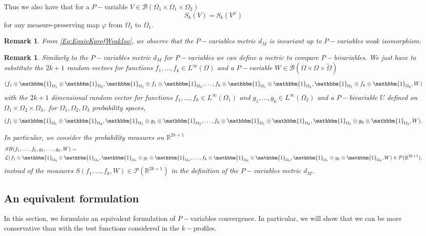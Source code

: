 \documentclass[11pt]{article}
\newtheorem{remark}[theorem]{Remark}
\def\R{\mathbb{R}}
\newcommand{\cB}{{\mathcal B}}  %
\newcommand{\cP}{{\mathcal P}}  %
\begin{document}
Thus we also have that for a $P-$variable  $V \in \cB(\Omega_1\times \Omega_1\times \Omega_2)$
$$
S_k(V)=S_k(V^{\varphi})
$$
for any measure-preserving map $\varphi$ from $\Omega_1$ to $\Omega_1.$

\begin{remark}\label{RMK:InvarianceKProfiles}
From \eqref{Eq:EquivKprofWeakIso}, we observe that the $P-$variables metric $d_M$ is invariant up to $P-$variables weak isomorphism. 
\end{remark}


\begin{remark}\label{RmkDistanseBBBisets}
Similarly to the $P-$variables metric $d_M$ for $P-$variables we can define a metric to compare $P-$bivariables. We just have to substitute the $2k+1$ random vectors for functions $f_1,\ldots, f_{k}\in L^{\infty}(\Omega)$ and a $P-$variable $W\in \cB(\Omega\times\Omega\times \widetilde\Omega)$ 
$$
(f_1 \otimes\mathbbm{1}_{\Omega_1} \otimes \mathbbm{1}_{\Omega_2},\mathbbm{1}_{\Omega_1}\otimes f_1 \otimes\mathbbm{1}_{\Omega_2},\ldots, f_k \otimes\mathbbm{1}_{\Omega_1} \otimes \mathbbm{1}_{\Omega_2},\mathbbm{1}_{\Omega_1}\otimes f_k \otimes\mathbbm{1}_{\Omega_2},W)
$$
with the $2k+1$ dimensional random vector for functions $f_1,\ldots, f_{k}\in L^{\infty}(\Omega_1)$ and $g_1,\ldots,g_k\in L^{\infty}(\Omega_2)$ and a $P-$bivariable $U$ defined on $\Omega_1\times \Omega_2 \times \Omega_3,$ for $\Omega_1,\Omega_2, \Omega_3$ probability spaces,
$$
(f_1 \otimes\mathbbm{1}_{\Omega_1} \otimes \mathbbm{1}_{\Omega_2},\mathbbm{1}_{\Omega_1}\otimes g_1 \otimes\mathbbm{1}_{\Omega_2},\ldots, f_k \otimes\mathbbm{1}_{\Omega_1} \otimes \mathbbm{1}_{\Omega_2},\mathbbm{1}_{\Omega_1}\otimes g_k \otimes\mathbbm{1}_{\Omega_2},W).
$$

In particular, we consider the probability measures on $\R^{2k+1}$
$$
\begin{aligned}
&SB(f_1,\ldots,f_k,g_1,\ldots,g_k,W)=\\
&\mathcal{L}(f_1 \otimes\mathbbm{1}_{\Omega_2} \otimes \mathbbm{1}_{\Omega_3},\mathbbm{1}_{\Omega_1}\otimes g_1 \otimes\mathbbm{1}_{\Omega_3},\ldots, f_k \otimes\mathbbm{1}_{\Omega_2} \otimes \mathbbm{1}_{\Omega_3},\mathbbm{1}_{\Omega_1}\otimes g_k \otimes\mathbbm{1}_{\Omega_3},W)\in \mathcal{P}(\R^{2k+1}).
\end{aligned}
$$
instead of the measures $S(f_1,\ldots,f_k,W)\in \cP(\R^{2k+1})$ in the definition of the $P-$variables metric $d_M.$
\end{remark}

\subsection{An equivalent formulation}
In this section, we formulate an equivalent formulation of $P-$variables convergence. In particular, we will show that we can be more conservative than with the test functions considered in the $k-$profiles. 
\end{document}
